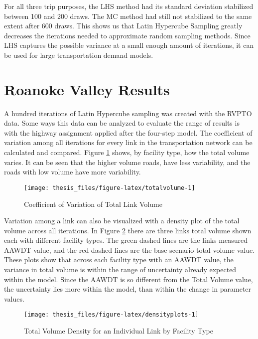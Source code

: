 \documentclass[fancy, masters,twoside]{byuthesis}
\begin{document}
For all three trip purposes, the LHS method had its standard deviation stabilized between 100 and 200 draws. The MC method had still not stabilized to the same extent after 600 draws. This shows us that Latin Hypercube Sampling greatly decreases the iterations needed to approximate random sampling methods. Since LHS captures the possible variance at a small enough amount of iterations, it can be used for large transportation demand models.

\hypertarget{roanoke-valley-results}{%
\section{Roanoke Valley Results}\label{roanoke-valley-results}}

A hundred iterations of Latin Hypercube sampling was created with the RVPTO data. Some ways this data can be analyzed to evaluate the range of results is with the highway assignment applied after the four-step model. The coefficient of variation among all iterations for every link in the transportation network can be calculated and compared. Figure \ref{fig:totalvolume} shows, by facility type, how the total volume varies. It can be seen that the higher volume roads, have less variability, and the roads with low volume have more variability.

\begin{figure}

{\centering \texttt{[image: thesis\_files/figure-latex/totalvolume-1]} 

}

\caption{Coefficient of Variation of Total Link Volume}\label{fig:totalvolume}
\end{figure}

Variation among a link can also be visualized with a density plot of the total volume across all iterations. In Figure \ref{fig:densityplots} there are three links total volume shown each with different facility types. The green dashed lines are the links measured AAWDT value, and the red dashed lines are the base scenario total volume value. These plots show that across each facility type with an AAWDT value, the variance in total volume is within the range of uncertainty already expected within the model. Since the AAWDT is so different from the Total Volume value, the uncertainty lies more within the model, than within the change in parameter values.

\begin{figure}

{\centering \texttt{[image: thesis\_files/figure-latex/densityplots-1]} 

}

\caption{Total Volume Density for an Individual Link by Facility Type}\label{fig:densityplots}
\end{figure}
\end{document}
